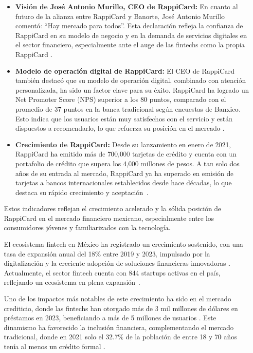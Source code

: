 \begin{itemize}
    \item \textbf{Visión de José Antonio Murillo, CEO de RappiCard:} En cuanto al futuro de la alianza entre RappiCard y Banorte, José Antonio Murillo comentó: “Hay mercado para todos”. Esta declaración refleja la confianza de RappiCard en su modelo de negocio y en la demanda de servicios digitales en el sector financiero, especialmente ante el auge de las fintechs como la propia RappiCard \cite{forbesrappibanorte}.
    \item \textbf{Modelo de operación digital de RappiCard:} El CEO de RappiCard también destacó que su modelo de operación digital, combinado con atención personalizada, ha sido un factor clave para su éxito. RappiCard ha logrado un Net Promoter Score (NPS) superior a los 80 puntos, comparado con el promedio de 37 puntos en la banca tradicional según encuestas de Banxico. Esto indica que los usuarios están muy satisfechos con el servicio y están dispuestos a recomendarlo, lo que refuerza su posición en el mercado \cite{forbesrappibanorte}.
    \item \textbf{Crecimiento de RappiCard:} Desde su lanzamiento en enero de 2021, RappiCard ha emitido más de 700,000 tarjetas de crédito y cuenta con un portafolio de crédito que supera los 4,000 millones de pesos. A tan solo dos años de su entrada al mercado, RappiCard ya ha superado en emisión de tarjetas a bancos internacionales establecidos desde hace décadas, lo que destaca su rápido crecimiento y aceptación~\cite{forbesrappibanorte}.
\end{itemize}

Estos indicadores reflejan el crecimiento acelerado y la sólida posición de RappiCard en el mercado financiero mexicano, especialmente entre los consumidores jóvenes y familiarizados con la tecnología.

\vspace{0.3cm}

El ecosistema fintech en México ha registrado un crecimiento sostenido, con una tasa de expansión anual del 18\% entre 2019 y 2023, impulsado por la digitalización y la creciente adopción de soluciones financieras innovadoras \cite{dock2024}. Actualmente, el sector fintech cuenta con 844 startups activas en el país, reflejando un ecosistema en plena expansión~\cite{finnovating2024}.

\vspace{0.3cm}

Uno de los impactos más notables de este crecimiento ha sido en el mercado crediticio, donde las fintechs han otorgado más de 3 mil millones de dólares en préstamos en 2023, beneficiando a más de 5 millones de usuarios \cite{uflow2024}. Este dinamismo ha favorecido la inclusión financiera, complementando el mercado tradicional, donde en 2021 solo el 32.7\% de la población de entre 18 y 70 años tenía al menos un crédito formal \cite{inegi2021}.


